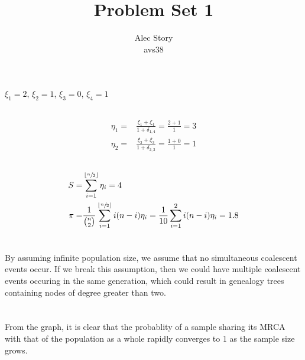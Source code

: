 \documentclass{article}
\title{Problem Set 1}
\author{Alec Story \\ \small{avs38}}
\begin{document}
\maketitle

\section{}
    \subsection{}
    $\xi_1 = 2$, $ \xi_2 = 1$, $ \xi_3 = 0$, $ \xi_4 = 1$
    \subsection{}
    \begin{align*}
    \eta_1 =& \frac{\xi_1 + \xi_4}{1 + \delta_{1, 4}} = \frac{2 + 1}{1} = 3 \\
    \eta_2 =& \frac{\xi_2 + \xi_3}{1 + \delta_{2, 3}} = \frac{1 + 0}{1} = 1
    \end{align*}
    \subsection{}
    \begin{align*}
    S =& \sum_{i=1}^{\lfloor \sfrac{n}{2} \rfloor} \eta_i = 4 \\
    \pi =& \frac{1}{\binom{n}{2}}
           \sum_{i=1}^{\lfloor \sfrac{n}{2} \rfloor} i (n - i) \eta_i = 
           \frac{1}{10} \sum_{i=1}^{2} i (n - i) \eta_i = 1.8
    \end{align*}
    \subsection{}
    \pagebreak
\section{}
By assuming infinite population size, we assume that no simultaneous coalescent
events occur.  If we break this assumption, then we could have multiple
coalescent events occuring in the same generation, which could result in
genealogy trees containing nodes of degree greater than two.
\section{}
\subsection{}
    \begin{figure}[h]
    \begin{center}
        
    \end{center}
    \end{figure}
    From the graph, it is clear that the probablity of a sample sharing its MRCA
    with that of the population as a whole rapidly converges to 1 as the sample
    size grows.
\end{document}
